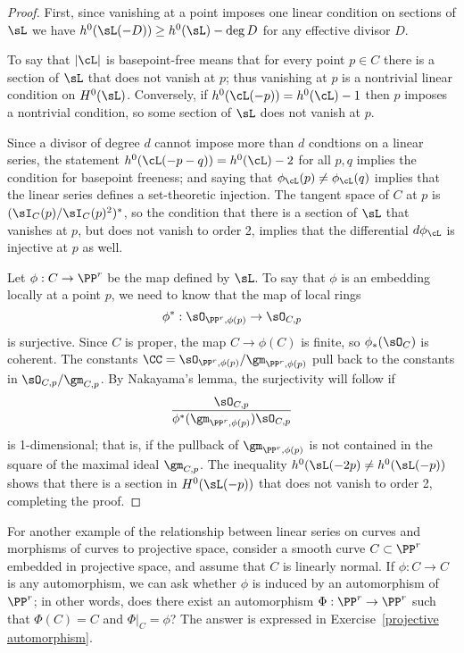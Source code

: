 \begin{proof}
First, since vanishing at a point imposes one linear condition on sections of $\sL$ we have $h^0(\sL(-D)) \geq h^0(\sL)-\deg D$ for any
effective divisor $D$.

To say that $|\cL|$ is basepoint-free means that for every point $p\in C$ there is a section of $\sL$ that does not vanish at $p$; thus vanishing
at $p$ is a nontrivial linear condition on $H^0(\sL)$. Conversely, if $h^0(\cL(-p)) = h^0(\cL) - 1$ then $p$ imposes a nontrivial condition, so
some section of $\sL$ does not vanish at $p$.

Since a divisor of degree $d$ cannot impose more than $d$ condtions on a linear series, the statement $h^0(\cL(-p-q)) = h^0(\cL) - 2$ for all $p, q$ implies the condition for basepoint freeness; and saying that $\phi_\cL(p) \neq \phi_\cL(q)$ implies that the linear series defines a set-theoretic injection. The tangent space of $C$ at $p$ is $(\sI_C(p)/\sI_C(p)^2)^*$, so the condition that there is a section of $\sL$ that vanishes at $p$, but does not vanish
to order 2, implies that the differential $d\phi_\cL$ is injective at $p$ as well.

Let $\phi:C \to \PP^r$ be the map defined by $\sL$. To say that $\phi$  is an embedding locally at a point $p$, we need to know that the map of local rings
$$
\phi^*: \sO_{\PP^r,\phi(p)} \to \sO_{C,p} 
$$
is surjective. Since $C$ is proper, the map $C\to \phi(C)$ is finite,
so $\phi_*(\sO_{C})$ is coherent.%
 The constants  $\CC =\sO_{\PP^r,\phi(p)}/\gm_{\PP^r,\phi(p)}$ pull back to the constants in
$\sO_{C,p}/\gm_{C,p}$. 
By Nakayama's lemma, the surjectivity will follow if 
$$
\frac{\sO_{C,p}}
{\phi^*(\gm_{\PP^r,\phi(p)})  \sO_{C,p}}
$$
is 1-dimensional; that is, if  the pullback of $\gm_{\PP^r,\phi(p)}$ is not contained in the square of the
maximal ideal $\gm_{C,p}$. The inequality $h^0(\sL(-2p) \neq h^0(\sL(-p))$ shows that there is a 
section in $H^0(\sL(-p))$ that does not vanish to order 2, completing the proof.
\end{proof}


For another example of the relationship between linear series on curves and morphisms of curves to projective space, consider a smooth curve $C \subset \PP^r$ embedded in projective space, and assume that $C$ is linearly normal. If $\phi : C \to C$ is any automorphism, we can ask whether $\phi$ is induced by an automorphism of $\PP^r$; in other words, does there exist an automorphism $\Phi : \PP^r \to \PP^r$ such that $\Phi(C) = C$ and $\Phi|_C = \phi$? The answer is expressed in Exercise~\ref{projective automorphism}.


